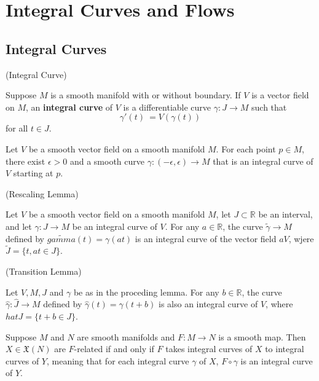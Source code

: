 \section{Integral Curves and Flows}

\subsection{Integral Curves}

\begin{definition}(Integral Curve)\par
    Suppose $M$ is a smooth manifold with or without boundary. If $V$ is a vector field on $M$, an \textbf{integral curve} of $V$ is a differentiable curve $\gamma:J\to M$ such that 
\[\gamma'(t)\ =  V(\gamma(t))\]
for all $t\in J$.
\end{definition}

\begin{proposition}
    Let $V$ be a smooth vector field on a smooth manifold $M$. For each point $p\in M$, there exist $\epsilon > 0$ and a smooth curve $\gamma:(-\epsilon,\epsilon) \to M$ that is an integral curve of $V$ starting at $p$.
\end{proposition}

\begin{lemma}(Rescaling Lemma)\par
    Let $V$ be a smooth vector field on a smooth manifold $M$, let $J\subset \mathbb{R}$ be an interval, and let $\gamma:J\to M$ be an integral curve of $V$. For any $a\in\mathbb{R}$, the curve $\tilde{\gamma}\to M$ defined by $\tilde{gamma}(t) = \gamma(at)$ is an integral curve of the vector field $aV$, wjere $\tilde{J} = \{t,at\in J\}$.
\end{lemma}

\begin{lemma}(Transition Lemma)\par
    Let $V,M,J$ and $\gamma$ be as in the proceding lemma. For any $b\in\mathbb{R}$, the curve $\hat{\gamma}:\hat{J} \to M$ defined by $\hat{\gamma}(t) = \gamma(t+b)$ is also an integral curve of $V$, where $hat{J} = \{t+b\in J\}$.
\end{lemma}

\begin{proposition}
    Suppose $M$ and $N$ are smooth manifolds and $F:M\to N$ is a smooth map. Then $X\in\mathfrak{X}(N)$ are $F$-related if and only if $F$ takes integral curves of $X$ to integral curves of $Y$, meaning that for each integral curve $\gamma$ of $X$, $F\circ\gamma$ is an integral curve of $Y$.
\end{proposition}

